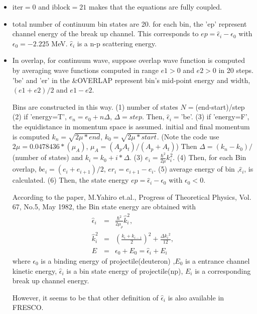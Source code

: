 \documentclass[11pt]{book}
\newcommand{\bea}{\begin{eqnarray}}
\newcommand{\eea}{\end{eqnarray}}
\newcommand{\no}{\nonumber \\}
\begin{document}
\begin{itemize}
\item iter$=0$ and iblock$=21$ makes that the equations are fully coupled. 
\item total number of continuum bin states are  20. 
      for each bin, the 'ep' represent channel energy of the break up channel.
      This corresponds to $ep=\hat{\epsilon}_i-\epsilon_0$ with $\epsilon_0=-2.225$ MeV. 
      $\hat{\epsilon}_i$ is a n-p scattering energy. 
\item In overlap, for continuum wave, suppose
      overlap wave function is computed by averaging 
      wave functions computed in range $e1>0$ and $e2>0$ in 20 steps. 
      'be' and 'er' in the \&OVERLAP represent bin's mid-point energy and width,      
      $(e1+e2)/2$ and $e1-e2$. 
      
      Bins are constructed in this way.
      (1) number of states $N=$(end-start)/step 
      (2) if 'energy=T', $e_n=e_0+n \Delta $, $\Delta=step$. 
          Then, $\hat{\epsilon}_i=$'be'. 
      (3) if 'energy=F', the equidistance in momentum space is assumed.
          initial and final momentum is computed $k_n=\sqrt{2\mu*end}$, 
          $k_0=\sqrt{2\mu*start}$. (Note the code use $2\mu=0.0478436*(\mu_A)$, $\mu_A=(A_p A_t)/(A_p+A_t)$) 
          Then $\Delta=(k_n-k_0)/$(number of states) and $k_i=k_0+i*\Delta $.
      (3) $e_i=\frac{\hbar^2}{2\mu}k_i^2$.
      (4) Then, for each Bin overlap, $be_i=(e_i+e_{i+1})/2$, $er_i=e_{i+1}-e_{i}$. 
      (5) average energy of bin ,$\hat{\epsilon}_i$, is calculated.
      (6) Then, the state energy $ep=\hat{\epsilon}_i-\epsilon_0$ with $\epsilon_0<0$.
         
       According to the paper, M.Yahiro et.al., Progress of Theoretical Physics, Vol. 67, No.5, May 1982, the Bin state energy are obtained with 
       \bea 
       \hat{\epsilon}_i&=&\frac{\hbar^2}{2\mu_\rho}\hat{k}_i^2,\no 
       \hat{k}_i^2&=& \left(\frac{k_i+k_{i-1}}{2}\right)^2+\frac{{\Delta k_i}^2}{12},\no 
       E&=&\epsilon_0+E_0
        =\hat{\epsilon}_i+E_i
       \eea  
       where $\epsilon_0$ is a binding energy of projectile(deuteron)
       ,$E_0$ is a entrance channel kinetic energy, $\hat{\epsilon}_i$ is a 
       bin state energy of projectile(np), $E_i$ is a corresponding break up channel energy. 
       
       However, it seems to be that other definition of $\hat{\epsilon}_i$ is also 
       available in FRESCO.  
        

\end{itemize}
\end{document}
